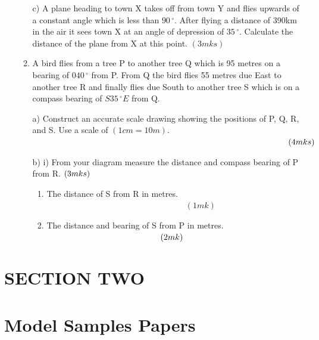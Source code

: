 \documentclass[
  a4paperpaper,
]{scrbook}
\begin{document}
\begin{enumerate}
\begin{tcolorbox}
\begin{enumerate}
    c) A plane heading to town X takes off from town Y and flies upwards
    of a constant angle which is less than \(90\,^{\circ}\). After
    flying a distance of 390km in the air it sees town X at an angle of
    depression of \(35\,^{\circ}\). Calculate the distance of the plane
    from X at this point. \((3mks)\)
  \item
    A bird flies from a tree P to another tree Q which is 95 metres on a
    bearing of \(040\,^{\circ}\) from P. From Q the bird flies 55 metres
    due East to another tree R and finally flies due South to another
    tree S which is on a compass bearing of \(S35\,^{\circ}E\) from Q.

    a) Construct an accurate scale drawing showing the positions of P,
    Q, R, and S. Use a scale of
    \((1cm = 10m)\).\(\hspace{10.8cm} (4mks)\)

    b) i) From your diagram measure the distance and compass bearing of
    P from R. \(\hspace{0.0cm} (3mks)\)

    \begin{enumerate}
    \def\labelenumiii{\roman{enumiii})}
    \setcounter{enumiii}{1}
    \item
      The distance of S from R in metres. \(\hspace{7cm} (1mk)\)
    \item
      The distance and bearing of S from P in metres.
      \(\hspace{4.8cm} (2mk)\)
    \end{enumerate}
  \end{enumerate}

  \end{tcolorbox}
\end{enumerate}


\hypertarget{section-two}{%
\chapter*{SECTION TWO}\label{section-two}}



\hypertarget{model-samples-papers}{%
\chapter*{Model Samples Papers}\label{model-samples-papers}}
\end{document}
